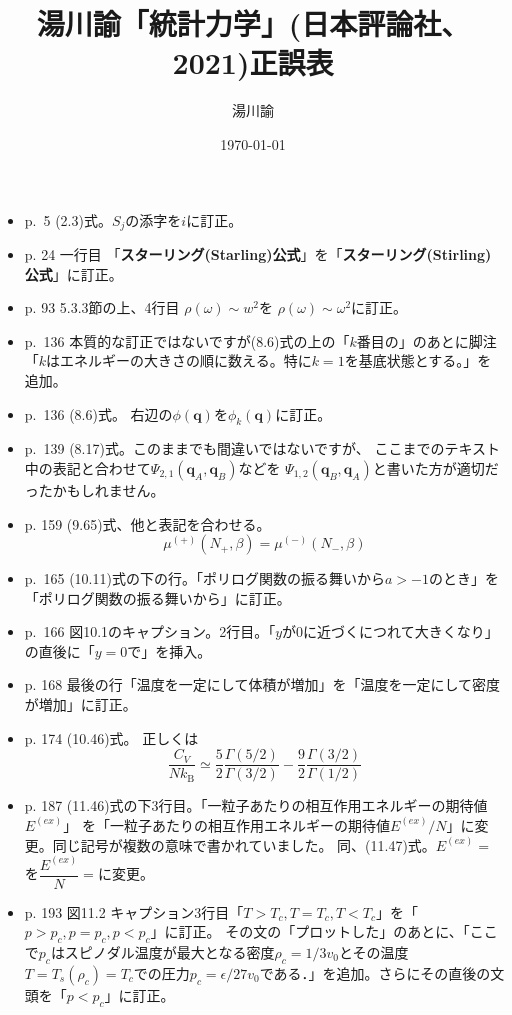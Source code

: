 \documentclass{ltjsarticle}
\begin{document}
\title{湯川諭「統計力学」(日本評論社、2021)正誤表}
\author{湯川諭}
\date{\today}
\maketitle
\begin{itemize}
\item p.~5 (2.3)式。$S_j$の添字を$i$に訂正。
\item
p. 24 一行目 「\textbf{スターリング(Starling)公式}」を「\textbf{スターリング(Stirling)公式}」に訂正。
\item
p. 93 5.3.3節の上、4行目 $\rho(\omega)\sim w^2$を
$\rho(\omega)\sim\omega^2$に訂正。
\item
p.~136 本質的な訂正ではないですが(8.6)式の上の「$k$番目の」のあとに脚注「$k$はエネルギーの大きさの順に数える。特に$k=1$を基底状態とする。」を追加。
\item
p.~136 (8.6)式。
右辺の$\phi(\boldsymbol{q})$を$\phi_{k}(\boldsymbol{q})$に訂正。
\item
p.~139 (8.17)式。このままでも間違いではないですが、
ここまでのテキスト中の表記と合わせて$\Psi_{2,1}(\boldsymbol{q}_{A}, \boldsymbol{q}_{B})$などを
$\Psi_{1,2}(\boldsymbol{q}_{B}, \boldsymbol{q}_{A})$と書いた方が適切だったかもしれません。
\item
p. 159 (9.65)式、他と表記を合わせる。
\[
\mu^{(+)}(N_{+},\beta) = \mu^{(-)}(N_{-},\beta)
\]
\item
p.~165 (10.11)式の下の行。「ポリログ関数の振る舞いから$a>-1$のとき」を「ポリログ関数の振る舞いから」に訂正。
\item
p.~166 図10.1のキャプション。2行目。「$y$が$0$に近づくにつれて大きくなり」の直後に「$y=0$で」を挿入。
\item
p. 168 最後の行「温度を一定にして体積が増加」を「温度を一定にして密度が増加」に訂正。
\item
p. 174 (10.46)式。
正しくは
\[
 \dfrac{C_V}{N k_\mathrm{B}}\simeq
 \dfrac{5}{2} \dfrac{\Gamma(5/2)}{\Gamma(3/2)} -
 \dfrac{9}{2} \dfrac{\Gamma(3/2)}{\Gamma(1/2)}
\]
\item
p. 187 (11.46)式の下3行目。「一粒子あたりの相互作用エネルギーの期待値$E^{(ex)}$」
を「一粒子あたりの相互作用エネルギーの期待値$E^{(ex)}\slash N$」に変更。同じ記号が複数の意味で書かれていました。
同、(11.47)式。$E^{(ex)}=$を$\dfrac{E^{(ex)}}{N}=$に変更。
\item
p. 193 図11.2 キャプション3行目「$T>T_{c}, T=T_{c}, T<T_{c}$」を「$p>p_{c},p=p_{c},p<p_{c}$」に訂正。
その文の「プロットした」のあとに、「ここで$p_{c}$はスピノダル温度が最大となる密度$\rho_c = 1\slash 3v_{0}$とその温度$T=T_s(\rho_{c})=T_{c}$での圧力$p_{c} = \epsilon\slash 27 v_{0}$である．」を追加。さらにその直後の文頭を「$p<p_{c}$」に訂正。

\end{itemize}
\end{document}
